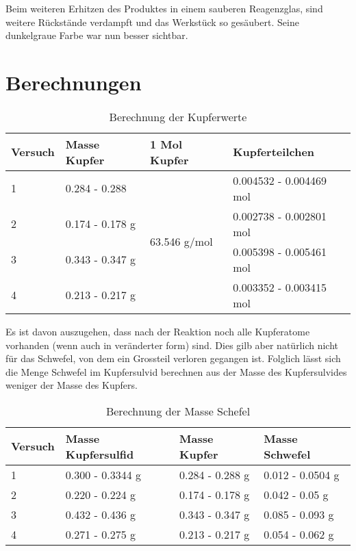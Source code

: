 \documentclass[11pt,paper=a4,final]{scrartcl}
\begin{document}
{Beim weiteren Erhitzen des Produktes in einem sauberen Reagenzglas, sind
weitere R\"uckst\"ande verdampft und das Werkst\"uck so ges\"aubert. Seine
dunkelgraue Farbe war nun besser sichtbar.
\section{Berechnungen}
\begin{table}[h!]
  \centering
  \begin{tabular}{|l|l|l|l|} \hline
    \bf Versuch & \bf Masse Kupfer & \bf 1 Mol Kupfer & \bf Kupferteilchen \\ \hline
    1	& 0.284 - 0.288	& \multirow{4}{*}{63.546 g/mol}	& 0.004532 - 0.004469
    mol \\ \cline{1-2} \cline{4-4}
    2	& 0.174 - 0.178 g& & 0.002738 - 0.002801 mol \\ \cline{1-2} \cline{4-4}
    3 	& 0.343 - 0.347 g& & 0.005398 - 0.005461 mol \\ \cline{1-2} \cline{4-4}
    4	& 0.213 - 0.217 g& & 0.003352 - 0.003415 mol \\ \hline
  \end{tabular}
  \caption{Berechnung der Kupferwerte}
  \label{tab:kupfer}
\end{table}

Es ist davon auszugehen, dass nach der Reaktion noch alle Kupferatome vorhanden
(wenn auch in ver\"anderter form) sind. Dies gilb aber nat\"urlich nicht f\"ur
das Schwefel, von dem ein Grossteil verloren gegangen ist. Folglich l\"asst sich
die Menge Schwefel im Kupfersulvid berechnen aus der Masse des Kupfersulvides
weniger der Masse des Kupfers.
\begin{table}[h!]
  \centering
  \begin{tabular}{|l|l|l|l|}\hline
  \bf Versuch & \bf Masse Kupfersulfid & \bf Masse Kupfer & \bf Masse Schwefel
  \\ \hline
  1 & 0.300 - 0.3344 g	& 0.284 - 0.288 g	& 0.012 - 0.0504 g \\ \hline
  2 & 0.220 - 0.224 g	& 0.174 - 0.178 g	& 0.042 - 0.05 g \\ \hline
  3 & 0.432 - 0.436 g	& 0.343 - 0.347 g	& 0.085 - 0.093 g \\ \hline
  4 & 0.271 - 0.275 g	& 0.213 - 0.217 g	& 0.054 - 0.062 g \\ \hline
  \end{tabular}
  \caption{Berechnung der Masse Schefel}
  \label{tab:schwefel}
\end{table}

}
\end{document}
